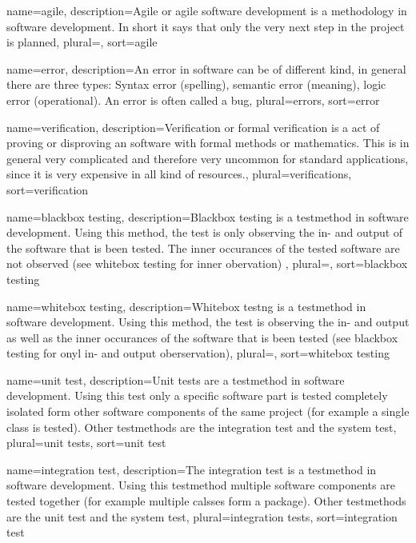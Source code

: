 {
	name=agile,
	description={Agile or agile software development is a methodology in
		software development. In short it says that only the very next
		step in the project is planned},
	plural=,
	sort=agile
}

{
	name=error,
	description={An error in software can be of different kind, in general
		there are three types: Syntax error (spelling), semantic error
		(meaning), logic error (operational). An error is often called
		a bug},
	plural=errors,
	sort=error
}

{
	name=verification,
	description={Verification or formal verification is a act of proving 
		or disproving an software with formal methods or mathematics.
		This is in general very complicated and therefore very
		uncommon for standard applications, since it is very 
		expensive in all kind of resources.},
	plural=verifications,
	sort=verification
}

{
	name={blackbox testing},
	description={Blackbox testing is a testmethod in software development.
		Using this method, the test is only observing the in- and 
		output of the software that is been tested. The inner
		occurances of the tested software are not observed (see
		\gls{whitebox testing} for inner obervation) },
	plural=,
	sort={blackbox testing}
}

{
	name={whitebox testing},
	description={Whitebox testng is a testmethod in software development.
		Using this method, the test is observing the in- and output
		as well as the inner occurances of the software that is been
		tested (see \gls{blackbox testing} for onyl in- and output
		oberservation)},
	plural=,
	sort={whitebox testing}
}

{
	name={unit test},
	description={Unit tests are a testmethod in software development.
		Using this test only a specific software part is tested
		completely isolated form other software components of the
		same project (for example a single class is tested). Other
		testmethods are the \gls{integration test} and the 
		\gls{system test}},
	plural={unit tests},
	sort={unit test}
}

{
	name={integration test},
	description={The integration test is a testmethod in software 
		development. Using this testmethod multiple software
		components are tested together (for example multiple
		calsses form a package). Other testmethods are the
		\gls{unit test} and the \gls{system test}},
	plural={integration tests},
	sort={integration test}
}

